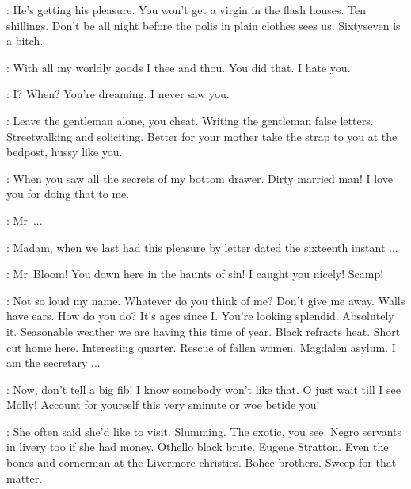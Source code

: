 \Bawd:
He's getting his pleasure.
You won't get a virgin in the flash houses.
Ten shillings.
Don't be all night before the polis in plain clothes sees us.
Sixtyseven is a bitch.


\Gerty:
With all my worldly goods I thee and thou.
 You did that.
I hate you.

\Bloom:
I? When?
You're dreaming.
I never saw you.

\Bawd:
Leave the gentleman alone, you cheat.
Writing the gentleman false letters.
Streetwalking and soliciting.
Better for your mother
take the strap to you at the bedpost, hussy like you.

\Gerty:
When you saw all the secrets of my bottom drawer.
Dirty married man!
I love you for doing that to me.


\MrsBreen:
Mr~...

\Bloom:
Madam, when we last had this pleasure by letter dated the sixteenth instant ...

\MrsBreen:
Mr~Bloom! You down here in the haunts of sin!
I caught you nicely! Scamp!

\Bloom:
Not so loud my name.
Whatever do you think of me?
Don't give me away.
Walls have ears.
How do you do? It's ages since I.
You're looking splendid.
Absolutely it.
Seasonable weather we are having this time of year.
Black refracts heat.
Short cut home here.
Interesting quarter.
Rescue of fallen women.
Magdalen asylum.
I am the secretary ...

\MrsBreen:
Now, don't tell a big fib!
I know somebody won't like that.
O just wait till I see Molly!
Account for yourself this very sminute or woe betide you!

\Bloom:
She often said she'd like to visit.
Slumming.
The exotic, you see.
Negro servants in livery too if she had money.
Othello black brute.
Eugene Stratton.
Even the bones and cornerman at the Livermore christies.
Bohee brothers.
Sweep for that matter.

